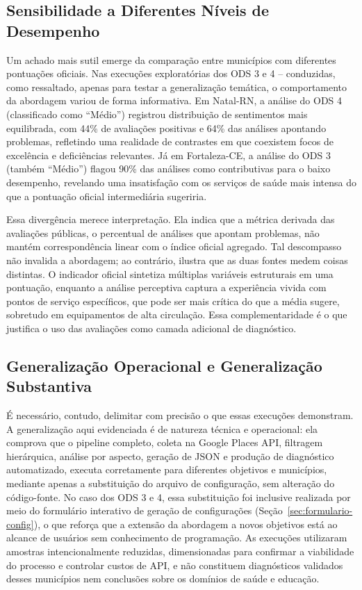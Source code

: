 \subsection{Sensibilidade a Diferentes Níveis de Desempenho}
\label{subsec:disc-sensibilidade}

Um achado mais sutil emerge da comparação entre municípios com diferentes pontuações oficiais. Nas execuções exploratórias dos ODS 3 e 4 -- conduzidas, como ressaltado, apenas para testar a generalização temática, o comportamento da abordagem variou de forma informativa. Em Natal-RN, a análise do ODS 4 (classificado como ``Médio'') registrou distribuição de sentimentos mais equilibrada, com 44\% de avaliações positivas e 64\% das análises apontando problemas, refletindo uma realidade de contrastes em que coexistem focos de excelência e deficiências relevantes. Já em Fortaleza-CE, a análise do ODS 3 (também ``Médio'') flagou 90\% das análises como contributivas para o baixo desempenho, revelando uma insatisfação com os serviços de saúde mais intensa do que a pontuação oficial intermediária sugeriria.

Essa divergência merece interpretação. Ela indica que a métrica derivada das avaliações públicas, o percentual de análises que apontam problemas, não mantém correspondência linear com o índice oficial agregado. Tal descompasso não invalida a abordagem; ao contrário, ilustra que as duas fontes medem coisas distintas. O indicador oficial sintetiza múltiplas variáveis estruturais em uma pontuação, enquanto a análise perceptiva captura a experiência vivida com pontos de serviço específicos, que pode ser mais crítica do que a média sugere, sobretudo em equipamentos de alta circulação. Essa complementaridade é o que justifica o uso das avaliações como camada adicional de diagnóstico.

\subsection{Generalização Operacional e Generalização Substantiva}
\label{subsec:disc-operacional-substantiva}

É necessário, contudo, delimitar com precisão o que essas execuções demonstram. A generalização aqui evidenciada é de natureza técnica e operacional: ela comprova que o pipeline completo, coleta na Google Places API, filtragem hierárquica, análise por aspecto, geração de JSON e produção de diagnóstico automatizado, executa corretamente para diferentes objetivos e municípios, mediante apenas a substituição do arquivo de configuração, sem alteração do código-fonte. No caso dos ODS 3 e 4, essa substituição foi inclusive realizada por meio do formulário interativo de geração de configurações (Seção~\ref{sec:formulario-config}), o que reforça que a extensão da abordagem a novos objetivos está ao alcance de usuários sem conhecimento de programação. As execuções utilizaram amostras intencionalmente reduzidas, dimensionadas para confirmar a viabilidade do processo e controlar custos de API, e não constituem diagnósticos validados desses municípios nem conclusões sobre os domínios de saúde e educação.

